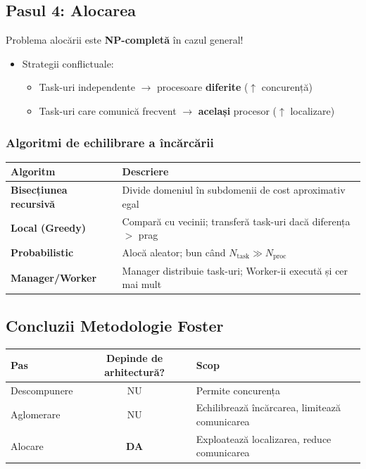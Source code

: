 \documentclass[a4paper,11pt]{article}
\newcommand{\thead}[1]{\cellcolor{tblheader}\color{white}\textbf{#1}}
\begin{document}
\subsection{Pasul 4: Alocarea}

\begin{tipbox}
Problema alocării este \textbf{NP-completă} în cazul general!
\end{tipbox}

\begin{itemize}[noitemsep]
  \item Strategii conflictuale:
    \begin{itemize}[noitemsep]
      \item Task-uri independente $\to$ procesoare \textbf{diferite} ($\uparrow$ concurență)
      \item Task-uri care comunică frecvent $\to$ \textbf{același} procesor ($\uparrow$ localizare)
    \end{itemize}
\end{itemize}

\subsubsection{Algoritmi de echilibrare a încărcării}

\begin{center}
\begin{tabularx}{\textwidth}{lX}
\toprule
\thead{Algoritm} & \thead{Descriere} \\
\midrule
\textbf{Bisecțiunea recursivă} & Divide domeniul în subdomenii de cost aproximativ egal \\
\textbf{Local (Greedy)} & Compară cu vecinii; transferă task-uri dacă diferența $>$ prag \\
\textbf{Probabilistic} & Alocă aleator; bun când $N_{\text{task}} \gg N_{\text{proc}}$ \\
\textbf{Manager/Worker} & Manager distribuie task-uri; Worker-ii execută și cer mai mult \\
\bottomrule
\end{tabularx}
\end{center}

\subsection{Concluzii Metodologie Foster}

\begin{center}
\begin{tabular}{lcl}
\toprule
\thead{Pas} & \thead{Depinde de arhitectură?} & \thead{Scop} \\
\midrule
Descompunere & NU & Permite concurența \\
Aglomerare & NU & Echilibrează încărcarea, limitează comunicarea \\
Alocare & \textbf{DA} & Exploatează localizarea, reduce comunicarea \\
\bottomrule
\end{tabular}
\end{center}
\end{document}
